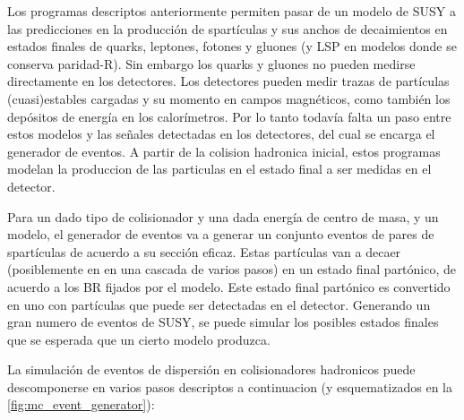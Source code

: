 Los programas descriptos anteriormente permiten pasar de un modelo de SUSY a las
predicciones en la producción de spartículas y sus anchos de decaimientos en
estados finales de quarks, leptones, fotones y gluones (y LSP en modelos donde
se conserva paridad-R). Sin embargo los quarks y gluones no pueden medirse
directamente en los detectores. Los detectores pueden medir trazas de partículas
(cuasi)estables cargadas y su momento en campos magnéticos, como también los
depósitos de energía en los calorímetros. Por lo tanto todavía falta un paso
entre estos modelos y las señales detectadas en los detectores, del cual se
encarga el generador de eventos. A partir de la colision hadronica inicial,
estos programas modelan la produccion de las particulas en el estado final a ser
medidas en el detector.

Para un dado tipo de colisionador y una dada energía de centro de masa, y un
modelo, el generador de eventos va a generar un conjunto eventos de pares de
spartículas de acuerdo a su sección eficaz. Estas partículas van a decaer
(posiblemente en en una cascada de varios pasos) en un estado final partónico,
de acuerdo a los BR fijados por el modelo. Este estado final partónico es
convertido en uno con partículas que puede ser detectadas en el detector.
Generando un gran numero de eventos de SUSY, se puede simular los posibles
estados finales que se esperada que un cierto modelo produzca.


La simulación de eventos de dispersión en colisionadores hadronicos puede
descomponerse en varios pasos descriptos a continuacion (y esquematizados en la
\cref{fig:mc_event_generator}):

